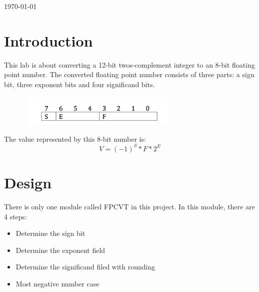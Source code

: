 \begin{titlepage}

{\large \today}\\[2cm] %


 

\vfill %

\end{titlepage}

\newpage
\section*{Introduction}
This lab is about converting a 12-bit twos-complement integer to an 8-bit floating point number. The converted floating point number consists of three parts: a sign bit, three exponent bits and four significand bits.\\
\begin{minipage}{\linewidth}
            \centering
            \includegraphics[width=10cm, height=1.5cm]{float-representation.png}
        \end{minipage}
The value represented by this 8-bit number is:
$$ V = (-1)^S * F * 2^E$$

\section*{Design}
There is only one module called FPCVT in this project. In this module, there are 4 steps: 
\begin{itemize}
	\item Determine the sign bit
	\item Determine the exponent field
	\item Determine the significand filed with rounding 
	\item Most negative number case
\end{itemize}

